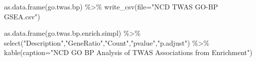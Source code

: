 \documentclass[
]{article}
\newenvironment{Shaded}{\begin{snugshade}}{\end{snugshade}}
\newcommand{\AttributeTok}[1]{\textcolor[rgb]{0.77,0.63,0.00}{#1}}
\newcommand{\FunctionTok}[1]{\textcolor[rgb]{0.00,0.00,0.00}{#1}}
\newcommand{\NormalTok}[1]{#1}
\newcommand{\SpecialCharTok}[1]{\textcolor[rgb]{0.00,0.00,0.00}{#1}}
\newcommand{\StringTok}[1]{\textcolor[rgb]{0.31,0.60,0.02}{#1}}
\begin{document}
\begin{Shaded}
\begin{Highlighting}[]
\FunctionTok{as.data.frame}\NormalTok{(go.twas.bp) }\SpecialCharTok{\%\textgreater{}\%}
  \FunctionTok{write\_csv}\NormalTok{(}\AttributeTok{file=}\StringTok{"NCD TWAS GO{-}BP GSEA.csv"}\NormalTok{)}

\FunctionTok{as.data.frame}\NormalTok{(go.twas.bp.enrich.simpl) }\SpecialCharTok{\%\textgreater{}\%} \FunctionTok{select}\NormalTok{(}\StringTok{"Description"}\NormalTok{,}\StringTok{"GeneRatio"}\NormalTok{,}\StringTok{"Count"}\NormalTok{,}\StringTok{"pvalue"}\NormalTok{,}\StringTok{"p.adjust"}\NormalTok{) }\SpecialCharTok{\%\textgreater{}\%} 
  \FunctionTok{kable}\NormalTok{(}\AttributeTok{caption=}\StringTok{"NCD GO BP Analysis of TWAS Associations from Enrichment"}\NormalTok{)}
\end{Highlighting}
\end{Shaded}
\end{document}
